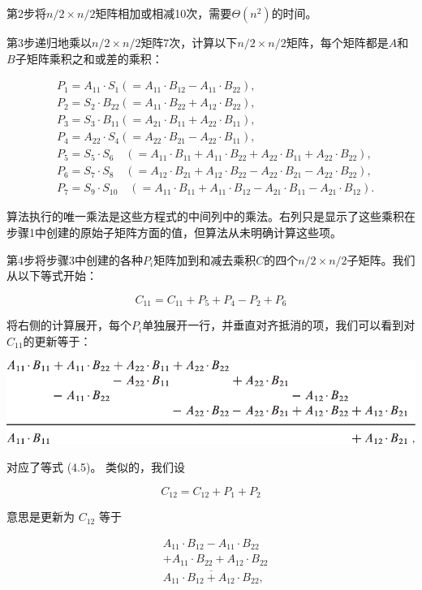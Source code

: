 \documentclass[lang=cn,newtx,10pt,scheme=chinese]{elegantbook}
\begin{document}
第2步将$n/2\times n/2$矩阵相加或相减10次，需要$\Theta\left(n^2\right)$的时间。

第3步递归地乘以$n/2\times n/2$矩阵7次，计算以下$n/2\times n/2$矩阵，每个矩阵都是$A$和$B$子矩阵乘积之和或差的乘积：


$$
\begin{aligned}
& P_1=A_{11} \cdot S_1\left(=A_{11} \cdot B_{12}-A_{11} \cdot B_{22}\right), \\
& P_2=S_2 \cdot B_{22}\left(=A_{11} \cdot B_{22}+A_{12} \cdot B_{22}\right), \\
& P_3=S_3 \cdot B_{11}\left(=A_{21} \cdot B_{11}+A_{22} \cdot B_{11}\right), \\
& P_4=A_{22} \cdot S_4\left(=A_{22} \cdot B_{21}-A_{22} \cdot B_{11}\right), \\
& P_5=S_5 \cdot S_6 \quad\left(=A_{11} \cdot B_{11}+A_{11} \cdot B_{22}+A_{22} \cdot B_{11}+A_{22} \cdot B_{22}\right), \\
& P_6=S_7 \cdot S_8 \quad\left(=A_{12} \cdot B_{21}+A_{12} \cdot B_{22}-A_{22} \cdot B_{21}-A_{22} \cdot B_{22}\right), \\
& P_7=S_9 \cdot S_{10} \quad\left(=A_{11} \cdot B_{11}+A_{11} \cdot B_{12}-A_{21} \cdot B_{11}-A_{21} \cdot B_{12}\right) .
\end{aligned}
$$

算法执行的唯一乘法是这些方程式的中间列中的乘法。右列只是显示了这些乘积在步骤1中创建的原始子矩阵方面的值，但算法从未明确计算这些项。

第4步将步骤3中创建的各种$P_i$矩阵加到和减去乘积$C$的四个$n/2\times n/2$子矩阵。我们从以下等式开始：


$$
C_{11}=C_{11}+P_5+P_4-P_2+P_6
$$

将右侧的计算展开，每个$P_i$单独展开一行，并垂直对齐抵消的项，我们可以看到对$C_{11}$的更新等于：

\includegraphics{算法导论第四版插图/第四章/斯特拉森算法公式.pdf}

对应了等式 (4.5)。 类似的，我们设

$$
C_{12}=C_{12}+P_1+P_2
$$

意思是更新为 $C_{12}$ 等于

$$
\begin{aligned}
& A_{11} \cdot B_{12}-A_{11} \cdot B_{22} \\
& +A_{11} \cdot B_{22}+A_{12} \cdot B_{22} \\
& \overline{A_{11} \cdot B_{12}+A_{12} \cdot B_{22}} \text {, } \\
&
\end{aligned}
$$
\end{document}
